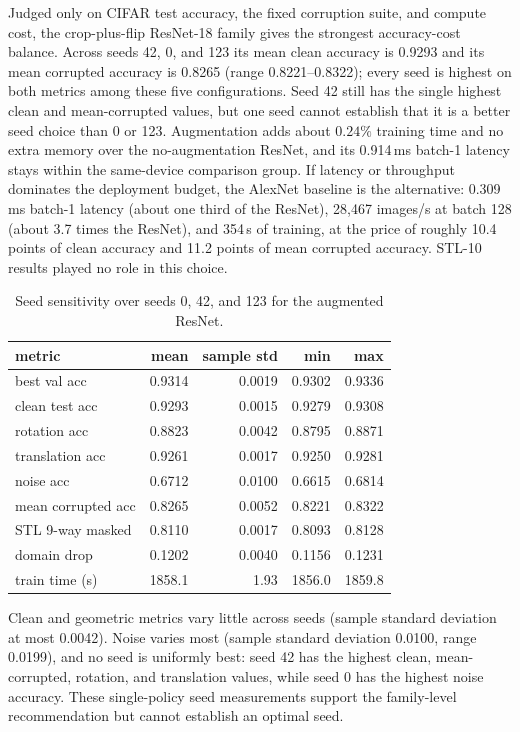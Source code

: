 \documentclass[11pt,a4paper]{article}
\begin{document}
Judged only on CIFAR test accuracy, the fixed corruption suite, and compute
cost, the crop-plus-flip ResNet-18 family gives the strongest accuracy-cost
balance. Across seeds 42, 0, and 123 its mean clean accuracy is 0.9293 and
its mean corrupted accuracy is 0.8265 (range 0.8221--0.8322); every seed is
highest on both metrics among these five configurations. Seed 42 still has
the single highest clean and mean-corrupted values, but one seed cannot
establish that it is a better seed choice than 0 or 123. Augmentation adds
about $0.24\%$ training time and no extra memory over the no-augmentation
ResNet, and its 0.914\,ms batch-1 latency stays within the same-device
comparison group. If latency or throughput dominates the deployment budget,
the AlexNet baseline is the alternative: 0.309\,ms batch-1 latency (about
one third of the ResNet), 28,467 images/s at batch 128 (about 3.7 times the
ResNet), and 354\,s of training, at the price of roughly 10.4 points of
clean accuracy and 11.2 points of mean corrupted accuracy. STL-10 results
played no role in this choice.

\begin{table}[H]
\centering
\small
\begin{tabular}{@{}lrrrr@{}}
\toprule
\textbf{metric} & \textbf{mean} & \textbf{sample std} & \textbf{min} & \textbf{max} \\
\midrule
best val acc & 0.9314 & 0.0019 & 0.9302 & 0.9336 \\
clean test acc & 0.9293 & 0.0015 & 0.9279 & 0.9308 \\
rotation acc & 0.8823 & 0.0042 & 0.8795 & 0.8871 \\
translation acc & 0.9261 & 0.0017 & 0.9250 & 0.9281 \\
noise acc & 0.6712 & 0.0100 & 0.6615 & 0.6814 \\
mean corrupted acc & 0.8265 & 0.0052 & 0.8221 & 0.8322 \\
STL 9-way masked & 0.8110 & 0.0017 & 0.8093 & 0.8128 \\
domain drop & 0.1202 & 0.0040 & 0.1156 & 0.1231 \\
train time (s) & 1858.1 & 1.93 & 1856.0 & 1859.8 \\
\bottomrule
\end{tabular}
\caption{Seed sensitivity over seeds 0, 42, and 123 for the augmented
ResNet.}
\label{tab:t6-seeds}
\end{table}

Clean and geometric metrics vary little across seeds (sample standard
deviation at most 0.0042). Noise varies most (sample standard deviation
0.0100, range 0.0199), and no seed is uniformly best: seed 42 has the
highest clean, mean-corrupted, rotation, and translation values, while seed
0 has the highest noise accuracy. These single-policy seed measurements
support the family-level recommendation but cannot establish an optimal
seed.
\end{document}
